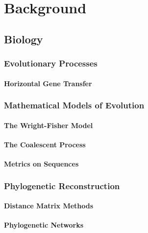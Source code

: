 \chapter{Background}
\label{ch:background}

\section{Biology}

\subsection{Evolutionary Processes}

\subsubsection{Horizontal Gene Transfer}

\subsection{Mathematical Models of Evolution}
\label{background:ss:evolutionary_models}

\subsubsection{The Wright-Fisher Model}

\subsubsection{The Coalescent Process}
\label{background:sss:coalescent}

\subsubsection{Metrics on Sequences}

\subsection{Phylogenetic Reconstruction}

\subsubsection{Distance Matrix Methods}

\subsubsection{Phylogenetic Networks}

